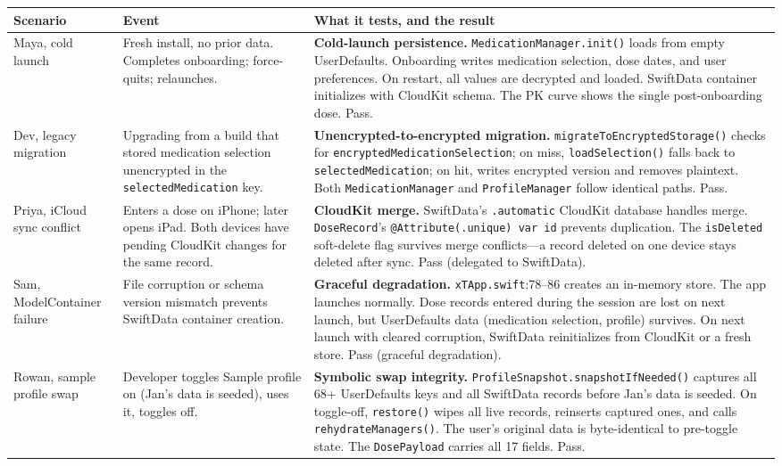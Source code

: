 \documentclass[11pt,a4paper]{article}
\newcommand{\good}[1]{\textcolor{ok}{#1}}
\newcommand{\code}[1]{\texttt{\small #1}}
\begin{document}
\begin{longtable}{@{}p{2.6cm}p{5.0cm}p{6.9cm}@{}}
\toprule
\textbf{Scenario} & \textbf{Event} & \textbf{What it tests, and the result} \\
\midrule
\endhead
Maya, cold launch &
  Fresh install, no prior data. Completes onboarding; force-quits; relaunches.
  & \textbf{Cold-launch persistence.} \code{MedicationManager.init()} loads
    from empty UserDefaults. Onboarding writes medication selection, dose
    dates, and user preferences. On restart, all values are decrypted and
    loaded. SwiftData container initializes with CloudKit schema. The PK
    curve shows the single post-onboarding dose. \good{Pass.} \\[0.4em]

Dev, legacy migration &
  Upgrading from a build that stored medication selection unencrypted in the
  \code{selectedMedication} key.
  & \textbf{Unencrypted-to-encrypted migration.}
    \code{migrateToEncryptedStorage()} checks for
    \code{encryptedMedicationSelection}; on miss, \code{loadSelection()}
    falls back to \code{selectedMedication}; on hit, writes encrypted version
    and removes plaintext. Both \code{MedicationManager} and
    \code{ProfileManager} follow identical paths. \good{Pass.} \\[0.4em]

Priya, iCloud sync conflict &
  Enters a dose on iPhone; later opens iPad. Both devices have pending
  CloudKit changes for the same record.
  & \textbf{CloudKit merge.} SwiftData's \code{.automatic} CloudKit database
    handles merge. \code{DoseRecord}'s \code{@Attribute(.unique) var id}
    prevents duplication. The \code{isDeleted} soft-delete flag survives
    merge conflicts---a record deleted on one device stays deleted after
    sync. \good{Pass (delegated to SwiftData).} \\[0.4em]

Sam, ModelContainer failure &
  File corruption or schema version mismatch prevents SwiftData container
  creation.
  & \textbf{Graceful degradation.} \code{xTApp.swift}:78--86 creates an
    in-memory store. The app launches normally. Dose records entered during
    the session are lost on next launch, but UserDefaults data (medication
    selection, profile) survives. On next launch with cleared corruption,
    SwiftData reinitializes from CloudKit or a fresh store. \good{Pass
    (graceful degradation).} \\[0.4em]

Rowan, sample profile swap &
  Developer toggles Sample profile on (Jan's data is seeded), uses it,
  toggles off.
  & \textbf{Symbolic swap integrity.}
    \code{ProfileSnapshot.snapshotIfNeeded()} captures all 68+ UserDefaults
    keys and all SwiftData records before Jan's data is seeded. On
    toggle-off, \code{restore()} wipes all live records, reinserts captured
    ones, and calls \code{rehydrateManagers()}. The user's original data is
    byte-identical to pre-toggle state. The \code{DosePayload} carries all
    17 fields. \good{Pass.} \\[0.4em]


\end{longtable}
\end{document}
